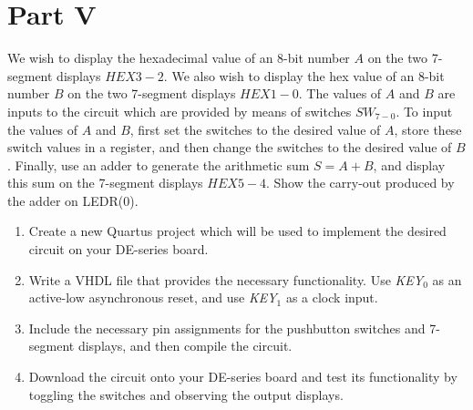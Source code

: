 \documentclass[epsfig,10pt,fullpage]{article}
\newcommand{\CommonDocsPath}{../../../common/docs}
\begin{document}
\section*{Part V}
We wish to display the hexadecimal value of an 8-bit number $A$
on the two 7-segment displays $HEX3-2$.  We also wish to display the
hex value of an 8-bit number $B$ on the two 7-segment displays $HEX1-0$. 
The values of $A$ and $B$ are inputs to the circuit which are
provided by means of switches $SW_{7-0}$.  To input the values of $A$ and $B$, 
first set the switches to the desired value of $A$, store these switch values in a register, 
and then change the switches to the desired value of $B$.  Finally, use an adder to 
generate the arithmetic sum $S = A + B$, and display this sum on the 7-segment 
displays $HEX5-4$. Show the carry-out produced by the adder on LEDR(0).
\begin{enumerate}
\item Create a new Quartus project which will be used to implement the desired
circuit on your DE-series board.
\item Write a VHDL file that provides the necessary functionality. Use {\it KEY}$_0$ as
an active-low asynchronous reset, and use {\it KEY}$_1$ as a clock input.
\item Include the necessary pin assignments for the pushbutton switches and 7-segment
displays, and then compile the circuit.
\item Download the circuit onto your DE-series board and test its functionality 
by toggling the switches and observing the output displays.
\end{enumerate}




\end{document}
